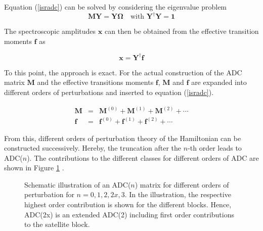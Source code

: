 Equation (\ref{isradc}) can be solved by
considering the eigenvalue problem
\begin{equation}\label{adcewp}
\mathbf{M} \mathbf{Y} = \mathbf{Y}\mathbf{\Omega} \quad\text{with } \mathbf{Y}^\dagger\mathbf{Y}=\mathbf{1}
\end{equation}

The spectroscopic amplitudes $\mathbf{x}$ can then be obtained from the
effective transition moments $\mathbf{f}$ as

\begin{equation}
 \mathbf{x} = \mathbf{Y}^\dagger \mathbf{f}
\end{equation}

To this point, the approach is exact.
For the actual construction of the \ac{ADC} matrix $\mathbf{M}$ and the
effective transitions moments $\mathbf{f}$, $\mathbf{M}$ and $\mathbf{f}$
are expanded into different orders of perturbations and inserted to equation
(\ref{isradc}).

\begin{eqnarray}
\mathbf{M} &=& \mathbf{M}^{(0)} + \mathbf{M}^{(1)} + \mathbf{M}^{(2)} + \cdots\label{stf}\\
\mathbf{f} &=& \mathbf{f}^{(0)} + \mathbf{f}^{(1)} + \mathbf{f}^{(2)} + \cdots\label{stf}
\end{eqnarray}

From this, different orders of perturbation theory of the Hamiltonian can be
constructed successively. Hereby, the truncation after the $n$-th order leads
to ADC($n$). The contributions to the different classes for different
orders of \ac{ADC} are shown
in Figure \ref{figure:adcmat_pgf} \cite{Trofimov05}.

\begin{figure}[h]
  \centering
  
  \caption{Schematic illustration of an \ac{ADC}($n$) matrix for different orders
           of perturbation for $n=0,1,2,2x,3$. In the illustration, the respective
           highest order contribution is shown for the different blocks.
           Hence, ADC(2x) is an extended ADC(2) including first
           order contributions to the satellite block.}
  \label{figure:adcmat_pgf}
\end{figure}

